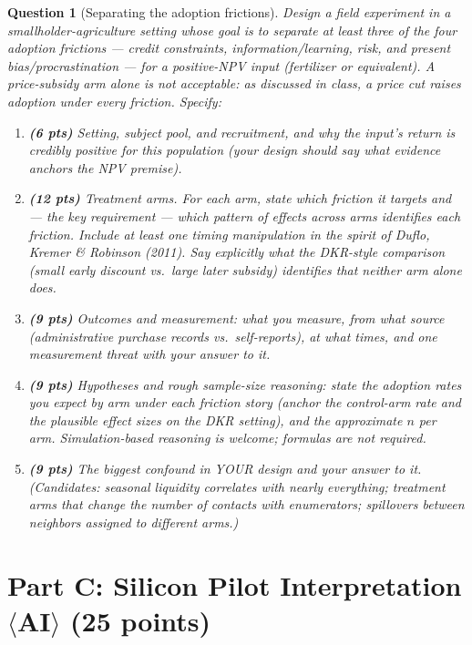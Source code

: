 \documentclass[11pt]{article}
\newtheorem{question}{Question}
\begin{document}
\begin{question}[Separating the adoption frictions]
Design a field experiment in a smallholder-agriculture setting whose goal
is to \emph{separate} at least three of the four adoption frictions ---
credit constraints, information/learning, risk, and present
bias/procrastination --- for a positive-NPV input (fertilizer or
equivalent). A price-subsidy arm alone is not acceptable: as discussed in
class, a price cut raises adoption under every friction. Specify:
\begin{enumerate}[label=(\alph*)]
  \item \textbf{(6 pts)} Setting, subject pool, and recruitment, and why
        the input's return is credibly positive for this population (your
        design should say what evidence anchors the NPV premise).
  \item \textbf{(12 pts)} Treatment arms. For each arm, state which
        friction it targets and --- the key requirement --- which
        \emph{pattern of effects across arms} identifies each friction.
        Include at least one timing manipulation in the spirit of Duflo,
        Kremer \& Robinson (2011). Say explicitly what the DKR-style
        comparison (small early discount vs.\ large later subsidy)
        identifies that neither arm alone does.
  \item \textbf{(9 pts)} Outcomes and measurement: what you measure, from
        what source (administrative purchase records vs.\ self-reports),
        at what times, and one measurement threat with your answer to it.
  \item \textbf{(9 pts)} Hypotheses and rough sample-size reasoning:
        state the adoption rates you expect by arm under each friction
        story (anchor the control-arm rate and the plausible effect sizes
        on the DKR setting), and the approximate $n$ per arm.
        Simulation-based reasoning is welcome; formulas are not required.
  \item \textbf{(9 pts)} The biggest confound in YOUR design and your
        answer to it. \emph{(Candidates: seasonal liquidity correlates
        with nearly everything; treatment arms that change the number of
        contacts with enumerators; spillovers between neighbors assigned
        to different arms.)}
\end{enumerate}
\end{question}

\section*{Part C: Silicon Pilot Interpretation $\langle$AI$\rangle$
(25 points)}
\end{document}
